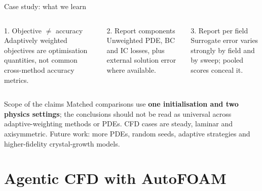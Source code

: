 \documentclass[aspectratio=169,10pt]{beamer}
\begin{document}
\begin{frame}{Case study: what we learn}
\begin{columns}[T,onlytextwidth]
\begin{block}{1. Objective $\ne$ accuracy}
\small Adaptively weighted objectives are optimisation quantities, not common cross-method accuracy metrics.
\end{block}
\begin{block}{2. Report components}
\small Unweighted PDE, BC and IC losses, plus external solution error where available.
\end{block}
\begin{block}{3. Report per field}
\small Surrogate error varies strongly by field and by sweep; pooled scores conceal it.
\end{block}
\end{columns}
\vspace{0.3cm}
\begin{alertblock}{Scope of the claims}
\small
Matched comparisons use \textbf{one initialisation and two physics settings}; the conclusions should not be read as universal across adaptive-weighting methods or PDEs. CFD cases are steady, laminar and axisymmetric. Future work: more PDEs, random seeds, adaptive strategies and higher-fidelity crystal-growth models.
\end{alertblock}
\end{frame}

\section{Agentic CFD with AutoFOAM}
\end{document}
